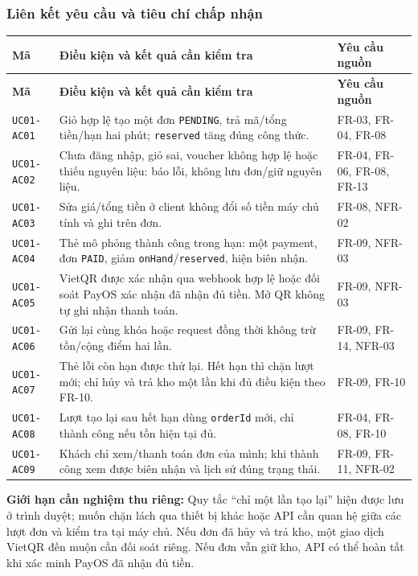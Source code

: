 \subsubsection{Liên kết yêu cầu và tiêu chí chấp nhận}
\renewcommand{\arraystretch}{1.16}
\begin{longtable}{@{}>{\raggedright\arraybackslash}p{}>{\raggedright\arraybackslash}p{}>{\raggedright\arraybackslash}p{}@{}}
\toprule
\textbf{Mã} & \textbf{Điều kiện và kết quả cần kiểm tra} & \textbf{Yêu cầu nguồn} \\
\midrule
\endfirsthead
\toprule
\textbf{Mã} & \textbf{Điều kiện và kết quả cần kiểm tra} & \textbf{Yêu cầu nguồn} \\
\midrule
\endhead
\texttt{UC01-AC01} & Giỏ hợp lệ tạo một đơn \texttt{PENDING}, trả mã/tổng tiền/hạn hai phút; \texttt{reserved} tăng đúng công thức. & FR-03, FR-04, FR-08 \\
\texttt{UC01-AC02} & Chưa đăng nhập, giỏ sai, voucher không hợp lệ hoặc thiếu nguyên liệu: báo lỗi, không lưu đơn/giữ nguyên liệu. & FR-04, FR-06, FR-08, FR-13 \\
\texttt{UC01-AC03} & Sửa giá/tổng tiền ở client không đổi số tiền máy chủ tính và ghi trên đơn. & FR-08, NFR-02 \\
\texttt{UC01-AC04} & Thẻ mô phỏng thành công trong hạn: một payment, đơn \texttt{PAID}, giảm \texttt{onHand}/\texttt{reserved}, hiện biên nhận. & FR-09, NFR-03 \\
\texttt{UC01-AC05} & VietQR được xác nhận qua webhook hợp lệ hoặc đối soát PayOS xác nhận đã nhận đủ tiền. Mở QR không tự ghi nhận thanh toán. & FR-09, NFR-03 \\
\texttt{UC01-AC06} & Gửi lại cùng khóa hoặc request đồng thời không trừ tồn/cộng điểm hai lần. & FR-09, FR-14, NFR-03 \\
\texttt{UC01-AC07} & Thẻ lỗi còn hạn được thử lại. Hết hạn thì chặn lượt mới; chỉ hủy và trả kho một lần khi đủ điều kiện theo FR-10. & FR-09, FR-10 \\
\texttt{UC01-AC08} & Lượt tạo lại sau hết hạn dùng \texttt{orderId} mới, chỉ thành công nếu tồn hiện tại đủ. & FR-04, FR-08, FR-10 \\
\texttt{UC01-AC09} & Khách chỉ xem/thanh toán đơn của mình; khi thành công xem được biên nhận và lịch sử đúng trạng thái. & FR-09, FR-11, NFR-02 \\
\bottomrule
\end{longtable}

\textbf{Giới hạn cần nghiệm thu riêng:} Quy tắc ``chỉ một lần tạo lại'' hiện được lưu ở trình duyệt; muốn chặn lách qua thiết bị khác hoặc API cần quan hệ giữa các lượt đơn và kiểm tra tại máy chủ. Nếu đơn đã hủy và trả kho, một giao dịch VietQR đến muộn cần đối soát riêng. Nếu đơn vẫn giữ kho, API có thể hoàn tất khi xác minh PayOS đã nhận đủ tiền.
